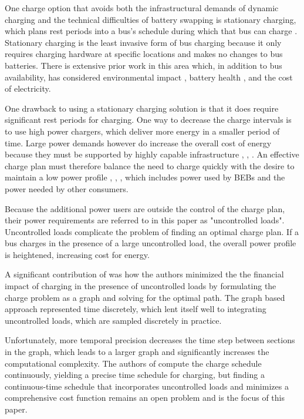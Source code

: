 \par One charge option that avoids both the infrastructural demands of dynamic charging and the technical difficulties of battery swapping is stationary charging, which plans rest periods into a bus's schedule during which that bus can charge \cite{whitaker_network_nodate}. Stationary charging is the least invasive form of bus charging because it only requires charging hardware at specific locations and makes no changes to bus batteries. There is extensive prior work in this area which, in addition to bus availability, has considered environmental impact \cite{zhou_bi-objective_2021}, battery health \cite{houbbadi_optimal_2019}, and the cost of electricity.
\par One drawback to using a stationary charging solution is that it does require significant rest periods for charging. One way to decrease the charge intervals is to use high power chargers, which deliver more energy in a smaller period of time. Large power demands however do increase the overall cost of energy because they must be supported by highly capable infrastructure \cite{stahleder_impact_2019}, \cite{deb_impact_2017}, \cite{boonraksa_impact_2019}. An effective charge plan must therefore balance the need to charge quickly with the desire to maintain a low power profile \cite{cheng_smart_2020}, \cite{ojer_development_2020}, \cite{qin_numerical_2016}, \cite{bagherinezhad_spatio-temporal_2020} which includes power used by BEBs and the power needed by other consumers.  
\par Because the additional power users are outside the control of the charge plan, their power requirements are referred to in this paper as "uncontrolled loads". Uncontrolled loads complicate the problem of finding an optimal charge plan. If a bus charges in the presence of a large uncontrolled load, the overall power profile is heightened, increasing cost for energy. 
\par A significant contribution of \cite{mortensen_comprehensive_2021} was how the authors minimized the the financial impact of charging in the presence of uncontrolled loads by formulating the charge problem as a graph and solving for the optimal path. The graph based approach represented time discretely, which lent itself well to integrating uncontrolled loads, which are sampled discretely in practice. 
\par Unfortunately, more temporal precision decreases the time step between sections in the graph, which leads to a larger graph and significantly increases the computational complexity. The authors of \cite{brown_position_nodate} compute the charge schedule continuously, yielding a precise time schedule for charging, but finding a continuous-time schedule that incorporates uncontrolled loads and minimizes a comprehensive cost function remains an open problem and is the focus of this paper. 
